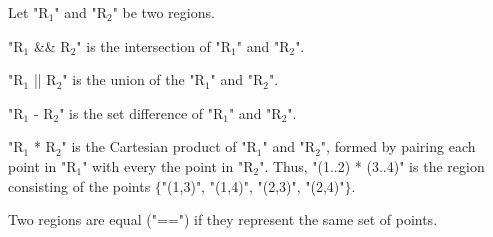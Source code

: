 Let \xcdmath"R$_1$" and \xcdmath"R$_2$" be two regions.

\xcdmath"R$_1$ && R$_2$" is the intersection of \xcdmath"R$_1$" and
\xcdmath"R$_2$".

\xcdmath"R$_1$ || R$_2$" is the union of the \xcdmath"R$_1$" and
\xcdmath"R$_2$".

\xcdmath"R$_1$ - R$_2$" is the set difference of \xcdmath"R$_1$" and
\xcdmath"R$_2$".

\xcdmath"R$_1$ * R$_2$" is the Cartesian product of \xcdmath"R$_1$" and
\xcdmath"R$_2$", 
formed by pairing each point in \xcdmath"R$_1$"
with every the point in \xcdmath"R$_2$".
Thus, \xcd"(1..2) * (3..4)"
is the region consisting of the points
$\{$\xcd"(1,3)", \xcd"(1,4)", \xcd"(2,3)", \xcd"(2,4)"$\}$.

Two regions are equal (\xcd"==") if they represent the same set of
points.

